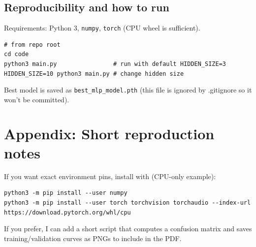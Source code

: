 \documentclass[12pt]{article}
\begin{document}
\subsection*{Reproducibility and how to run}
Requirements: Python 3, \texttt{numpy}, \texttt{torch} (CPU wheel is sufficient).
\begin{verbatim}
# from repo root
cd code
python3 main.py                # run with default HIDDEN_SIZE=3
HIDDEN_SIZE=10 python3 main.py # change hidden size
\end{verbatim}
Best model is saved as \texttt{best\_mlp\_model.pth} (this file is ignored by .gitignore so it won't be committed).

\section*{Appendix: Short reproduction notes}
If you want exact environment pins, install with (CPU-only example):
\begin{verbatim}
python3 -m pip install --user numpy
python3 -m pip install --user torch torchvision torchaudio --index-url https://download.pytorch.org/whl/cpu
\end{verbatim}

\vspace{6pt}
\noindent{}If you prefer, I can add a short script that computes a confusion matrix and saves training/validation curves as PNGs to include in the PDF.
\end{document}
